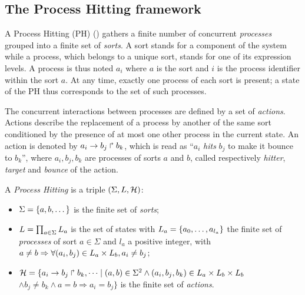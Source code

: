 \subsection{The Process Hitting framework}
\label{ssec:PH}

A Process Hitting (PH) () gathers a finite number of concurrent \emph{processes}
grouped into a finite set of \emph{sorts}.
A sort stands for a component of the system while a process, which belongs to a unique sort, stands for one of its expression levels.
A process is thus noted $a_i$ where $a$ is the sort and $i$ is the process identifier within the sort $a$.
At any time, exactly one process of each sort is present; a state of the PH thus corresponds to the set of such processes.
 
The concurrent interactions between processes are defined by a set of
\emph{actions}.
Actions describe the replacement of a process by another of the same sort
conditioned by the presence of at most one other process in the current state.
An action is denoted by $a_i\rightarrow b_j\Rsh b_k$, which is read as
``$a_i$ \emph{hits} $b_j$ to make it bounce to $b_k$'',
where $a_i,b_j,b_k$ are processes of sorts $a$ and $b$,
called respectively \emph{hitter}, \emph{target} and
\emph{bounce} of the action.

\begin{definition}\label{def:PH}
A \emph{Process Hitting} is a triple $(\Sigma,L,\mathcal{H})$:
\begin{itemize}
\item $\Sigma = \{a,b,\dots\}$ is the finite set of \emph{sorts};
\item $L = \prod_{a\in\Sigma} L_a$ is the set of states with $L_a = \{a_0,\dots,a_{l_a}\}$
the finite set of \emph{processes} of sort $a\in\Sigma$ and $l_a$ a positive integer, with
	$a\neq b\Rightarrow \forall(a_i,b_j)\in L_a\times L_b,a_i\neq b_j$;
\item $\mathcal{H} = \{ a_i\rightarrow b_j\Rsh b_k, \dots \mid
					(a,b)\in\Sigma^2 \wedge (a_i,b_j,b_k)\in L_a\times L_b\times L_b$ \\
	\hspace*{2cm} $\wedge b_j\neq b_k \wedge a=b\Rightarrow a_i=b_j\}$
			is the finite set of \emph{actions}.
\end{itemize}
\end{definition}


